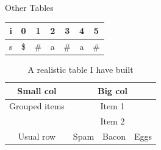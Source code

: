 \begin{frame}{\LARGE Other Tables}

\begin{tabular}{ccccccc}
\hline
    i & 0 & 1 & 2 & 3 & 4 & 5\\
\hline
    s & \$ & \# & a & \# & a & \# \\
\hline
\end{tabular}

\begin{table}
\caption{A realistic table I have built}
\label{tab:table}
\begin{tabular}{|c||ccc|}
\hline \hline
    Small col & \multicolumn{3}{|c|}{Big col} \\
\hline
    Grouped items & \multicolumn{3}{|c|}{Item 1} \\
\cline{2-4}
    & \multicolumn{3}{|c|}{Item 2} \\
\hline
    Usual row & Spam & Bacon & Eggs \\
\hline\hline
\end{tabular}
\end{table}

\end{frame}
